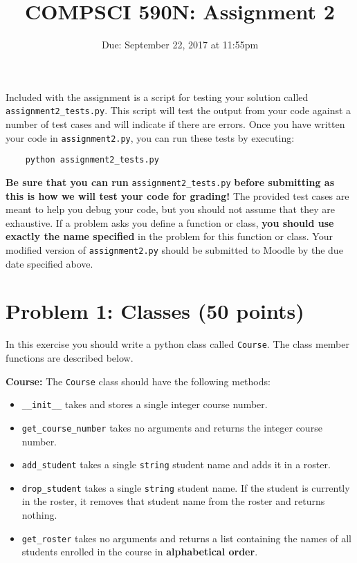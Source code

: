\documentclass[11pt]{article} %
\title{COMPSCI 590N: Assignment 2}
\date{Due: September 22, 2017 at 11:55pm}
\begin{document}
\thispagestyle{empty}
\pagestyle{empty}

\maketitle

Included with the assignment is a script for testing your solution called \verb|assignment2_tests.py|. This script will test the output from your code against a number of test cases and will indicate if there are errors. Once you have written your code in \verb|assignment2.py|, you can run these tests by executing:

\begin{verbatim}
	python assignment2_tests.py
\end{verbatim}

\textbf{Be sure that you can run} \verb|assignment2_tests.py| \textbf{before submitting as this is how we will test your code for grading!} The provided test cases are meant to help you debug your code, but you should not assume that they are exhaustive. If a problem asks you define a function or class, \textbf{you should use exactly the name specified} in the problem for this function or class. Your modified version of \verb|assignment2.py| should be submitted to Moodle by the due date specified above. 

\section*{Problem 1: Classes (50 points)}
In this exercise you should write a python class called \verb|Course|. The class member functions are described below.

\bigskip
\textbf{Course:} The \verb|Course| class should have the following methods:
\begin{itemize}
\item \verb|__init__| takes and stores a single integer course number.
\item \verb|get_course_number| takes no arguments and returns the integer course number.
\item \verb|add_student| takes a single \verb|string| student name and adds it in a roster.
\item \verb|drop_student| takes a single \verb|string| student name. If the student is currently in the roster, it removes that student name from the roster and returns nothing.
\item \verb|get_roster| takes no arguments and returns a list containing the names of all students enrolled in the course in \textbf{alphabetical order}.
\end{itemize}
\end{document}
